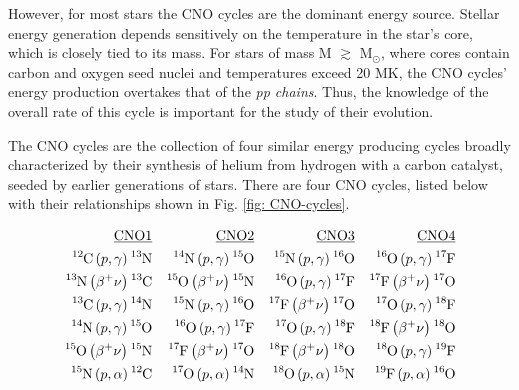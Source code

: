 However, for most stars the CNO cycles are the dominant energy source. Stellar energy generation depends sensitively on the temperature in the star's core, which is closely tied to its mass. For stars of mass M $\gtrsim$ M$_{\odot}$, where cores contain carbon and oxygen seed nuclei and temperatures exceed 20 MK, the CNO cycles' energy production overtakes that of the \textit{pp chains}. Thus, the knowledge of the overall rate of this cycle is important for the study of their evolution. 

The CNO cycles are the collection of four similar energy producing cycles broadly characterized by their synthesis of helium from hydrogen with a carbon catalyst, seeded by earlier generations of stars. There are four CNO cycles, listed below with their relationships shown in Fig. \ref{fig: CNO-cycles}.

\begin{align*}
\underline{\mathrm{CNO1}} & & \underline{\mathrm{CNO2}} & &\underline{\mathrm{CNO3}}  & & \underline{\mathrm{CNO4}} & \\
\ce{^{12}C} \left( p, \gamma \right) \ce{^{13}N} & & \ce{^{14}N} \left( p, \gamma \right) \ce{^{15}O} & & \ce{^{15}N} \left( p, \gamma \right) \ce{^{16}O} & & \ce{^{16}O} \left( p, \gamma \right) \ce{^{17}F}\\
\ce{^{13}N} \left( \beta^{+} \nu \right) \ce{^{13}C} & & \ce{^{15}O} \left( \beta^{+} \nu \right) \ce{^{15}N} & & \ce{^{16}O} \left( p, \gamma \right) \ce{^{17}F} & & \ce{^{17}F} \left( \beta^{+} \nu \right) \ce{^{17}O} \\
\ce{^{13}C} \left( p, \gamma \right) \ce{^{14}N} & & \ce{^{15}N} \left( p, \gamma \right) \ce{^{16}O} & & \ce{^{17}F} \left( \beta^{+} \nu \right) \ce{^{17}O} & & \ce{^{17}O} \left( p, \gamma \right) \ce{^{18}F}\\
\ce{^{14}N} \left( p, \gamma \right) \ce{^{15}O} & & \ce{^{16}O} \left( p, \gamma \right) \ce{^{17}F} & & \ce{^{17}O} \left( p, \gamma \right) \ce{^{18}F} & & \ce{^{18}F} \left( \beta^{+} \nu \right) \ce{^{18}O} \\
\ce{^{15}O} \left( \beta^{+} \nu \right) \ce{^{15}N} & & \ce{^{17}F} \left( \beta^{+} \nu \right) \ce{^{17}O} & & \ce{^{18}F} \left( \beta^{+} \nu \right) \ce{^{18}O} & & \ce{^{18}O} \left( p, \gamma \right) \ce{^{19}F}\\
\ce{^{15}N} \left( p, \alpha \right) \ce{^{12}C} & & \ce{^{17}O} \left( p, \alpha \right) \ce{^{14}N} & & \ce{^{18}O} \left( p, \alpha \right) \ce{^{15}N} & & \ce{^{19}F} \left( p, \alpha \right) \ce{^{16}O}
\end{align*}

